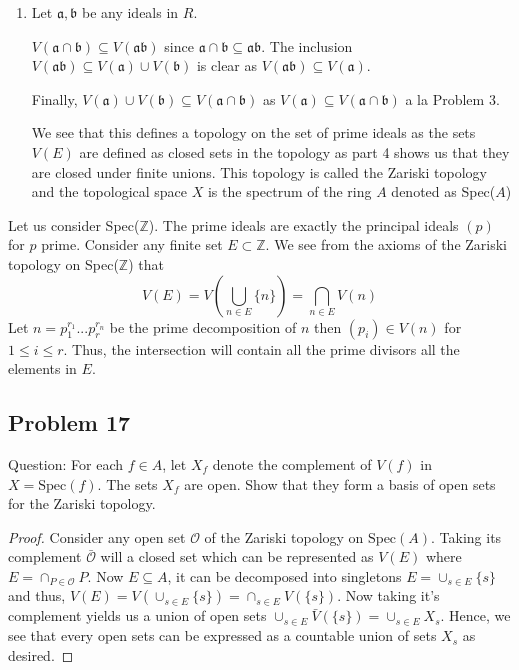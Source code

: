 \documentclass[12pt]{article}
\begin{document}
\begin{enumerate}
\item Let $\mathfrak{a},\mathfrak{b}$ be any ideals in $R$.

$V(\mathfrak{a} \cap \mathfrak{b}) \subseteq V(\mathfrak{a}\mathfrak{b})$ since $\mathfrak{a} \cap \mathfrak{b} \subseteq \mathfrak{ab}$. The inclusion $V(\mathfrak{a}  \mathfrak{b}) \subseteq V(\mathfrak{a}) \cup V(\mathfrak{b})$ is clear as $V(\mathfrak{a}  \mathfrak{b}) \subseteq V(\mathfrak{a}) $.

Finally, $V(\mathfrak{a}) \cup V(\mathfrak{b}) \subseteq V(\mathfrak{a} \cap \mathfrak{b})$ as $V(\mathfrak{a}) \subseteq V(\mathfrak{a} \cap  \mathfrak{b})$ a la Problem 3.

We see that this defines a topology on the set of prime ideals as the sets $V(E)$ are defined as closed sets in the topology as part 4 shows us that they are closed under finite unions. This topology is called the Zariski topology and the topological space $X$ is the spectrum of the ring $A$ denoted as Spec($A$)
\end{enumerate}

Let us consider Spec($\mathbb{Z}$). The prime ideals are exactly the principal ideals $(p)$ for $p$ prime. Consider any finite set $E \subset \mathbb{Z}$. We see from the axioms of the Zariski topology on Spec($\mathbb{Z}$) that 
$$ V(E) = V(\bigcup_{n \in E} \{ n\}) = \bigcap_{n \in E} V(n) $$
Let $n = p_1^{r_1}...p_r^{r_n}$ be the prime decomposition of $n$
then $(p_i) \in V(n)$ for $1 \leq i \leq r$. Thus, the intersection will contain all the prime divisors  all the elements in $E$. 

\subsection{Problem 17}

Question: For each $f \in A$, let $X_f$ denote the complement of $V(f)$ in $X = \text{Spec}(f)$. The sets $X_f$ are open. Show that they form a basis of open sets for the Zariski topology.
\begin{proof}
 Consider any open set $\mathcal{O}$ of the Zariski topology on $\text{Spec}(A)$. Taking its complement $\bar{\mathcal{O}}$
 will a closed set which can be represented as $V(E)$ where $E = \cap_{P \in \mathcal{O}} P$. Now $E \subseteq A$, it can be decomposed into singletons
 $E = \cup_{s \in E} \{s\}$ and thus, $V(E) = V(\cup_{s \in E} \{s\}) = \cap_{s \in E} V(\{s\})$. Now taking it's complement yields us a union of open sets
 $\cup_{s \in E} \bar{V}(\{s\}) = \cup_{s \in E} X_s$. Hence, we see that every open sets can be expressed as a countable union of sets $X_s$ as desired. 
\end{proof}
\end{document}
